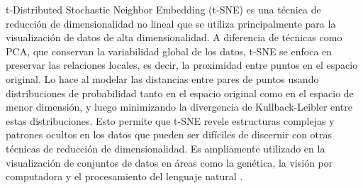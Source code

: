 \documentclass[10pt,journal,compsoc]{IEEEtran}
\begin{document}
t-Distributed Stochastic Neighbor Embedding (t-SNE) es una técnica de reducción de dimensionalidad no lineal que se utiliza principalmente para la visualización de datos de alta dimensionalidad. A diferencia de técnicas como PCA, que conservan la variabilidad global de los datos, t-SNE se enfoca en preservar las relaciones locales, es decir, la proximidad entre puntos en el espacio original. Lo hace al modelar las distancias entre pares de puntos usando distribuciones de probabilidad tanto en el espacio original como en el espacio de menor dimensión, y luego minimizando la divergencia de Kullback-Leibler entre estas distribuciones. Esto permite que t-SNE revele estructuras complejas y patrones ocultos en los datos que pueden ser difíciles de discernir con otras técnicas de reducción de dimensionalidad. Es ampliamente utilizado en la visualización de conjuntos de datos en áreas como la genética, la visión por computadora y el procesamiento del lenguaje natural \cite{maaten2008tsne}.
\end{document}
